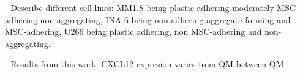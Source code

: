 





% 

\unnsubsection{\cadddiversitytitle}%
\label{sec:discussion_cadddiversity}%

- Describe different cell lines: MM1.S being plastic adhering moderately
MSC-adhering non-aggregating, INA-6 being non adhering aggregate forming and
MSC-adhering, U266 being plastic adhering, non MSC-adhering and
non-aggregating.

- Results from this work: CXCL12 expresion varies from QM between QM

